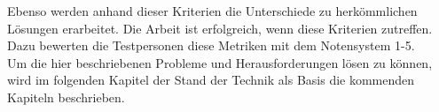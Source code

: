Ebenso werden anhand dieser Kriterien die Unterschiede zu herkömmlichen Lösungen erarbeitet. Die Arbeit ist erfolgreich, wenn diese Kriterien zutreffen. Dazu bewerten die Testpersonen diese Metriken mit dem Notensystem 1-5.\\ 

Um die hier beschriebenen Probleme und Herausforderungen lösen zu können, wird im folgenden Kapitel der Stand der Technik als Basis die kommenden Kapiteln beschrieben.

